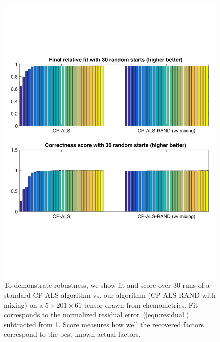 \begin{figure}[h]
  \centering 
  \includegraphics[width=0.6\linewidth]{figs/tammyexperiment}
  \caption{To demonstrate robustness, we show fit and score over 30 runs of a standard CP-ALS algorithm vs. our algorithm (CP-ALS-RAND with mixing) on a $5 \times 201 \times 61$ tensor drawn from chemometrics. Fit corresponds to the normalized residual error~(\cref{eqn:residual}) subtracted from 1. Score measures how well the recovered factors correspond to the best known actual factors.}
  \label{fig:tammyexperiment}
\end{figure}
